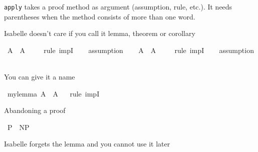 \begin{isabellebody}
\begin{isamarkuptext}
  {\tt apply} takes a proof method as argument (assumption, rule,
  etc.). It needs parentheses when the method consists of more than
  one word.%
\end{isamarkuptext}\isamarkuptrue%
%
\begin{isamarkuptext}%
Isabelle doesn't care if you call it lemma, theorem or corollary%
\end{isamarkuptext}\isamarkuptrue%
\isamarkupfalse%
\ {\isachardoublequoteopen}A\ {\isasymlongrightarrow}\ A{\isachardoublequoteclose}\ \isanewline
%
\isadelimproof
\ \ %
\endisadelimproof
%
\isatagproof
{}\isamarkupfalse%
\ {\isacharparenleft}{\kern0pt}rule\ impI{\isacharparenright}{\kern0pt}\isanewline
\ \ \isamarkupfalse%
\ assumption\isanewline
\ \ \isamarkupfalse%
%
\endisatagproof
{\isafoldproof}%
%
\isadelimproof
\isanewline
%
\endisadelimproof
\isanewline
{}\isamarkupfalse%
\ {\isachardoublequoteopen}A\ {\isasymlongrightarrow}\ A{\isachardoublequoteclose}\ \isanewline
%
\isadelimproof
\ \ %
\endisadelimproof
%
\isatagproof
{}\isamarkupfalse%
\ {\isacharparenleft}{\kern0pt}rule\ impI{\isacharparenright}{\kern0pt}\isanewline
\ \ \isamarkupfalse%
\ assumption\isanewline
\ \ \isamarkupfalse%
%
\endisatagproof
{\isafoldproof}%
%
\isadelimproof
%
\endisadelimproof
%
\begin{isamarkuptext}%
You can give it a name%
\end{isamarkuptext}\isamarkuptrue%
\isamarkupfalse%
\ mylemma{\isacharcolon}{\kern0pt}\ {\isachardoublequoteopen}A\ {\isasymlongrightarrow}\ A{\isachardoublequoteclose}%
\isadelimproof
\ %
\endisadelimproof
%
\isatagproof
{}\isamarkupfalse%
\ {\isacharparenleft}{\kern0pt}rule\ impI{\isacharparenright}{\kern0pt}%
\endisatagproof
{\isafoldproof}%
%
\isadelimproof
%
\endisadelimproof
%
\begin{isamarkuptext}%
Abandoning a proof%
\end{isamarkuptext}\isamarkuptrue%
\isamarkupfalse%
\ {\isachardoublequoteopen}P\ {\isacharequal}{\kern0pt}\ NP{\isachardoublequoteclose}\isanewline
\ \ %
\isanewline
%
\isadelimproof
\ \ %
\endisadelimproof
%
\isatagproof
{}\isamarkupfalse%
%
\endisatagproof
{\isafoldproof}%
%
\isadelimproof
%
\endisadelimproof
%
\begin{isamarkuptext}%
Isabelle forgets the lemma and you cannot use it later%
\end{isamarkuptext}\isamarkuptrue%

\end{isabellebody}
